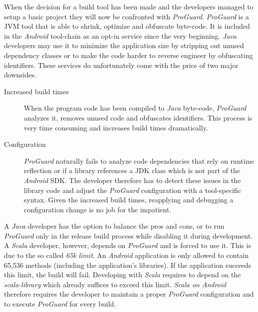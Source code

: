 \begin{description}
	When the decision for a build tool has been made and the developers managed to setup a basic project they will now be confronted with \textit{ProGuard}. \textit{ProGuard} is a \ac{JVM} tool that is able to shrink, optimize and obfuscate byte-code. It is included in the \textit{Android} tool-chain as an opt-in service since the very beginning. \textit{Java} developers may use it to minimize the application size by stripping out unused dependency classes or to make the code harder to reverse engineer by obfuscating identifiers. These services do unfortunately come with the price of two major downsides.

	\begin{description}

		\item[Increased build times]\hfill

		When the program code has been compiled to \textit{Java} byte-code, \textit{ProGuard} analyzes it, removes unused code and obfuscates identifiers. This process is very time consuming and increases build times dramatically.

		\item[Configuration]\hfill

		\textit{ProGuard} naturally fails to analyze code dependencies that rely on runtime reflection or if a library references a \ac{JDK} class which is not part of the \textit{Android} \ac{SDK}. The developer therefore has to detect these issues in the library code and adjust the \textit{ProGuard} configuration with a tool-specific syntax. Given the increased build times, reapplying and debugging a configuration change is no job for the impatient.

	\end{description}

	A \textit{Java} developer has the option to balance the pros and cons, or to run \textit{ProGuard} only in the release build process while disabling it during development. A \textit{Scala} developer, however, depends on \textit{ProGuard} and is forced to use it. This is due to the so called \textit{65k limit}. An \textit{Android} application is only allowed to contain 65,536 methods (including the application's libraries). If the application succeeds this limit, the build will fail. Developing with \textit{Scala} requires to depend on the \textit{scala-library} which already suffices to exceed this limit. \textit{Scala on Android} therefore requires the developer to maintain a proper \textit{ProGuard} configuration and to execute \textit{ProGuard} for every build.


\end{description}
